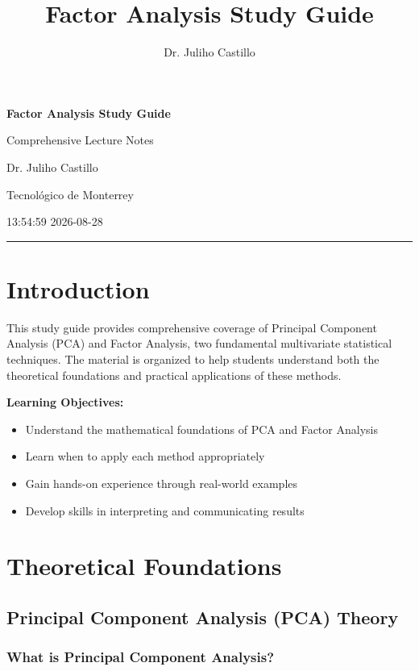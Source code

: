 \documentclass[
]{article}
\title{Factor Analysis Study Guide}
\author{Dr. Juliho Castillo}
\date{}
\begin{document}
\maketitle

\textbf{Factor Analysis Study Guide}

Comprehensive Lecture Notes

Dr. Juliho Castillo

Tecnológico de Monterrey

13:54:59 2026-08-28

\begin{center}\rule{0.5\linewidth}{0.5pt}\end{center}

\section{Introduction}

This study guide provides comprehensive coverage of Principal Component
Analysis (PCA) and Factor Analysis, two fundamental multivariate
statistical techniques. The material is organized to help students
understand both the theoretical foundations and practical applications
of these methods.

\textbf{Learning Objectives:}

\begin{itemize}
\item
  Understand the mathematical foundations of PCA and Factor Analysis
\item
  Learn when to apply each method appropriately
\item
  Gain hands-on experience through real-world examples
\item
  Develop skills in interpreting and communicating results
\end{itemize}

\section{Theoretical Foundations}

\subsection{Principal Component Analysis (PCA) Theory}

\subsubsection{What is Principal Component Analysis?}
\end{document}
